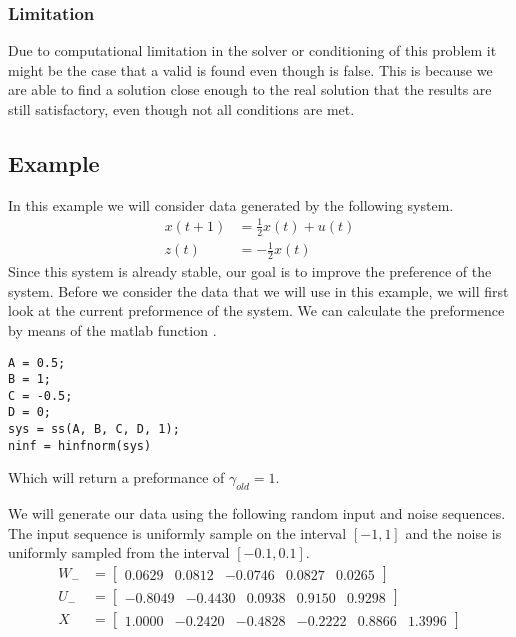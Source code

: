 \subsubsection*{Limitation}
Due to computational limitation in the solver or conditioning of this problem it might be the case that a valid  is found even though  is false. This is because we are able to find a solution close enough to the real solution that the results are still satisfactory, even though not all conditions are met. 

\subsection{Example}
In this example we will consider data generated by the following system.
\begin{align*}
	x(t+1) &= \frac{1}{2}x(t) + u(t) \\
	z(t)   &=  -\frac{1}{2}x(t)
\end{align*}
Since this system is already stable, our goal is to improve the preference of the system. Before we consider the data that we will use in this example, we will first look at the current preformence of the system. We can calculate the preformence by means of the matlab function .
\begin{lstlisting}
A = 0.5;
B = 1;
C = -0.5;
D = 0;
sys = ss(A, B, C, D, 1);
ninf = hinfnorm(sys)
\end{lstlisting}
Which will return a preformance of $\gamma_{old} = 1$.
 
We will generate our data using the following random input and noise sequences. The input sequence is uniformly sample on the interval $[-1,1]$ and the noise is uniformly sampled from the interval $[-0.1, 0.1]$.
\begin{align*}
	W_- &= \begin{bmatrix}  0.0629 &   0.0812 &  -0.0746 &   0.0827 &   0.0265 \end{bmatrix} \\
	U_- &= \begin{bmatrix} -0.8049 &  -0.4430 &   0.0938 &   0.9150 &   0.9298 \end{bmatrix} \\
	X   &= \begin{bmatrix}  1.0000 &  -0.2420 &  -0.4828 &  -0.2222 &   0.8866  &  1.3996 \end{bmatrix}
\end{align*}

